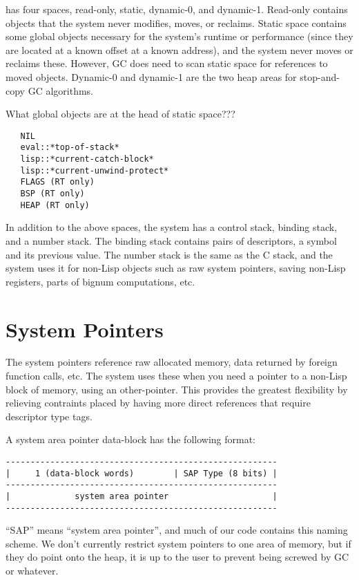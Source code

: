 \cmucl{} has four spaces, read-only, static, dynamic-0, and dynamic-1.
Read-only contains objects that the system never modifies, moves, or reclaims.
Static space contains some global objects necessary for the system's runtime or
performance (since they are located at a known offset at a known address), and
the system never moves or reclaims these.  However, GC does need to scan static
space for references to moved objects.  Dynamic-0 and dynamic-1 are the two
heap areas for stop-and-copy GC algorithms.

What global objects are at the head of static space???
\begin{verbatim}
   NIL
   eval::*top-of-stack*
   lisp::*current-catch-block*
   lisp::*current-unwind-protect*
   FLAGS (RT only)
   BSP (RT only)
   HEAP (RT only)
\end{verbatim}

In addition to the above spaces, the system has a control stack, binding stack,
and a number stack.  The binding stack contains pairs of descriptors, a symbol
and its previous value.  The number stack is the same as the C stack, and the
system uses it for non-Lisp objects such as raw system pointers, saving
non-Lisp registers, parts of bignum computations, etc.



\section{System Pointers}

The system pointers reference raw allocated memory, data returned by foreign
function calls, etc.  The system uses these when you need a pointer to a
non-Lisp block of memory, using an other-pointer.  This provides the greatest
flexibility by relieving contraints placed by having more direct references
that require descriptor type tags.

A system area pointer data-block has the following format:
\begin{verbatim}
-------------------------------------------------------
|     1 (data-block words)        | SAP Type (8 bits) |
-------------------------------------------------------
|             system area pointer                     |
-------------------------------------------------------
\end{verbatim}

``SAP'' means ``system area pointer'', and much of our code contains this naming
scheme.  We don't currently restrict system pointers to one area of memory, but
if they do point onto the heap, it is up to the user to prevent being screwed
by GC or whatever.

